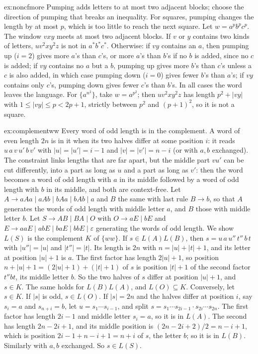 \begin{solution}{ex:noncfmore}
\idea Pumping adds letters to at most two adjacent blocks; choose the direction of pumping that breaks an inequality. For squares, pumping changes the length by at most $p$, which is too little to reach the next square.
\writeup Let $w=a^pb^pc^p$. The window $vxy$ meets at most two adjacent blocks. If $v$ or $y$ contains two kinds of letters, $uv^2xy^2z$ is not in $a^*b^*c^*$. Otherwise: if $vy$ contains an $a$, then pumping up ($i=2$) gives more $a$'s than $c$'s, or more $a$'s than $b$'s if no $b$ is added, since no $c$ is added; if $vy$ contains no $a$ but a $b$, pumping up gives more $b$'s than $c$'s unless a $c$ is also added, in which case pumping down ($i=0$) gives fewer $b$'s than $a$'s; if $vy$ contains only $c$'s, pumping down gives fewer $c$'s than $b$'s. In all cases the word leaves the language.
For $\{a^{n^2}\}$, take $w=a^{p^2}$; then $uv^2xy^2z$ has length $p^2+|vy|$ with $1\le|vy|\le p<2p+1$, strictly between $p^2$ and $(p+1)^2$, so it is not a square.
\end{solution}

\begin{solution}{ex:complementww}
\idea Every word of odd length is in the complement. A word of even length $2n$ is in it when its two halves differ at some position $i$: it reads $u\,a\,v\,u'\,b\,v'$ with $|u|=|u'|=i-1$ and $|v|=|v'|=n-i$ (or with $a,b$ exchanged). The constraint links lengths that are far apart, but the middle part $vu'$ can be cut differently, into a part as long as $u$ and a part as long as $v'$: then the word becomes a word of odd length with $a$ in its middle followed by a word of odd length with $b$ in its middle, and both are context-free.
\writeup Let $A\to aAa\mid aAb\mid bAa\mid bAb\mid a$ and $B$ the same with last rule $B\to b$, so that $A$ generates the words of odd length with middle letter $a$, and $B$ those with middle letter $b$. Let $S\to AB\mid BA\mid O$ with $O\to aE\mid bE$ and $E\to aaE\mid abE\mid baE\mid bbE\mid\varepsilon$ generating the words of odd length. We show $L(S)$ is the complement $K$ of $\{ww\}$.
If $s\in L(A)L(B)$, then $s=u\,a\,u''\,t''\,b\,t$ with $|u''|=|u|$ and $|t''|=|t|$. Its length is $2n$ with $n=|u|+|t|+1$, and its letter at position $|u|+1$ is $a$. The first factor has length $2|u|+1$, so position $n+|u|+1=(2|u|+1)+(|t|+1)$ of $s$ is position $|t|+1$ of the second factor $t''bt$, its middle letter $b$. So the two halves of $s$ differ at position $|u|+1$, and $s\in K$. The same holds for $L(B)L(A)$, and $L(O)\subseteq K$.
Conversely, let $s\in K$. If $|s|$ is odd, $s\in L(O)$. If $|s|=2n$ and the halves differ at position $i$, say $s_i=a$ and $s_{n+i}=b$, let $u=s_1\cdots s_{i-1}$, and split $s=s_1\cdots s_{2i-1}\cdot s_{2i}\cdots s_{2n}$. The first factor has length $2i-1$ and middle letter $s_i=a$, so it is in $L(A)$. The second has length $2n-2i+1$, and its middle position is $(2n-2i+2)/2=n-i+1$, which is position $2i-1+n-i+1=n+i$ of $s$, the letter $b$; so it is in $L(B)$. Similarly with $a,b$ exchanged. So $s\in L(S)$.
\end{solution}


